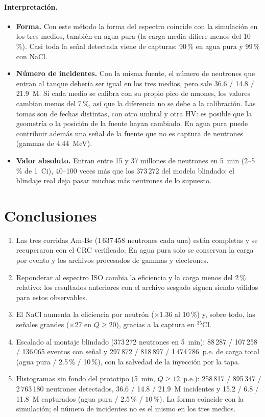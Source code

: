 \documentclass[11pt,a4paper]{article}
\begin{document}
\paragraph{Interpretación.}
\begin{itemize}
\item \textbf{Forma.} Con este método la forma del espectro coincide con la simulación en los tres medios, también en agua pura
(la carga media difiere menos del 10\,\%). Casi toda la señal detectada viene de capturas: 90\,\% en agua pura y 99\,\% con NaCl.
\item \textbf{Número de incidentes.} Con la misma fuente, el número de neutrones que entran al tanque debería ser igual en los tres
medios, pero sale 36.6 / 14.8 / 21.9~M. Si cada medio se calibra con su propio pico de
muones, los valores cambian menos del 7\,\%, así que la diferencia no se debe a la calibración. Las tomas son de fechas distintas,
con otro umbral y otra HV: es posible que la geometría o la posición de la fuente hayan cambiado. En agua pura puede contribuir
además una señal de la fuente que no es captura de neutrones (gammas de 4.44~MeV).
\item \textbf{Valor absoluto.} Entran entre 15 y 37 millones de neutrones en 5~min (2--5\,\% de 1~Ci), 40--100 veces más que los
373\,272 del modelo blindado: el blindaje real deja pasar muchos más neutrones de lo supuesto.
\end{itemize}

\section{Conclusiones}
\begin{enumerate}
\item Las tres corridas Am-Be (1\,637\,458 neutrones cada una) están completas y se recuperaron con el CRC verificado. En agua pura solo se conservan la carga por evento y los archivos procesados de gammas y electrones.
\item Reponderar al espectro ISO cambia la eficiencia y la carga menos del 2\,\% relativo: los resultados anteriores con el archivo sesgado siguen siendo válidos para estos observables.
\item El NaCl aumenta la eficiencia por neutrón ($\times$1.36 al 10\,\%) y, sobre todo, las señales grandes ($\times$27 en $Q\geq20$), gracias a la captura en $^{35}$Cl.
\item Escalado al montaje blindado (373\,272 neutrones en 5~min): 88\,287 / 107\,258 / 136\,065 eventos con señal y
297\,872 / 818\,897 / 1\,474\,786~p.e. de carga total (agua pura / 2.5\,\% / 10\,\%), con la salvedad de la inyección por la tapa.
\item Histogramas sin fondo del prototipo (5~min, $Q\geq12$~p.e.): 258\,817 / 895\,347 / 2\,763\,180 neutrones detectados, 36.6 / 14.8 / 21.9~M incidentes y 15.2 / 6.8 / 11.8~M capturados (agua pura / 2.5\,\% / 10\,\%). La forma coincide con la simulación; el número de incidentes no es el mismo en los tres medios.
\end{enumerate}
\end{document}
